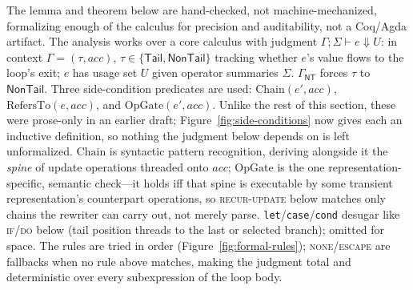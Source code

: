 \documentclass[sigplan,review,anonymous]{acmart}
\begin{document}
The lemma and theorem below are hand-checked, not machine-mechanized, formalizing enough of the calculus for precision and auditability, not a Coq/Agda artifact. The analysis works over a core calculus with judgment $\Gamma; \Sigma \vdash e \Downarrow U$: in context $\Gamma = (\tau, acc)$, $\tau \in \{\mathsf{Tail}, \mathsf{NonTail}\}$ tracking whether $e$'s value flows to the loop's exit; $e$ has usage set $U$ given operator summaries $\Sigma$. $\Gamma_{\mathsf{NT}}$ forces $\tau$ to $\mathsf{NonTail}$. Three side-condition predicates are used: $\mathrm{Chain}(e', acc)$, $\mathrm{RefersTo}(e, acc)$, and $\mathrm{OpGate}(e', acc)$. Unlike the rest of this section, these were prose-only in an earlier draft; Figure~\ref{fig:side-conditions} now gives each an inductive definition, so nothing the judgment below depends on is left unformalized. $\mathrm{Chain}$ is syntactic pattern recognition, deriving alongside it the \emph{spine} of update operations threaded onto $acc$; $\mathrm{OpGate}$ is the one representation-specific, semantic check---it holds iff that spine is executable by some transient representation's counterpart operations, so \textsc{recur-update} below matches only chains the rewriter can carry out, not merely parse. \texttt{let}/\texttt{case}/\texttt{cond} desugar like \textsc{if}/\textsc{do} below (tail position threads to the last or selected branch); omitted for space. The rules are tried in order (Figure~\ref{fig:formal-rules}); \textsc{none}/\textsc{escape} are fallbacks when no rule above matches, making the judgment total and deterministic over every subexpression of the loop body.
\end{document}
